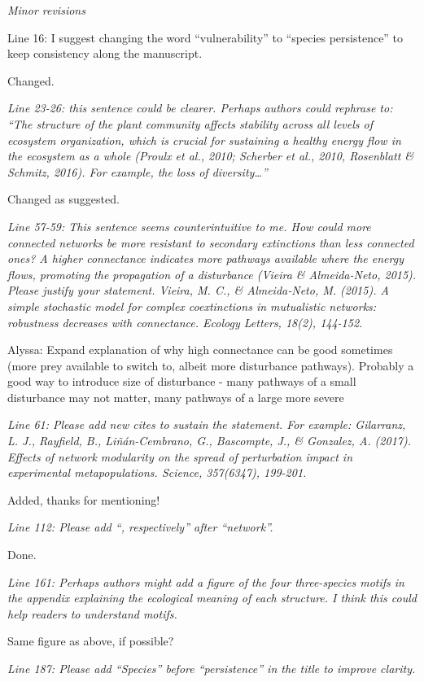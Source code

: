 \documentclass[12pt]{article}
\newcommand{\us}{\rm \setlength{\leftskip}{0.3cm} \setlength{\rightskip}{0.3cm}}
\newcommand{\them}{\it \setlength{\leftskip}{0cm} \setlength{\rightskip}{0cm}}
\begin{document}
\them
Minor revisions

Line 16: I suggest changing the word “vulnerability” to “species persistence” to keep consistency along the manuscript.

\us
Changed.

\them
Line 23-26: this sentence could be clearer. Perhaps authors could rephrase to: “The structure of the plant community affects stability across all levels of ecosystem organization, which is crucial for sustaining a healthy energy flow in the ecosystem as a whole (Proulx et al., 2010; Scherber et al., 2010, Rosenblatt & Schmitz, 2016). For example, the loss of diversity…”

\us Changed as suggested.

\them
Line 57-59: This sentence seems counterintuitive to me. How could more connected networks be more resistant to secondary extinctions than less connected ones? A higher connectance indicates more pathways available where the energy flows, promoting the propagation of a disturbance (Vieira \& Almeida-Neto, 2015). Please justify your statement.
Vieira, M. C., \& Almeida‐Neto, M. (2015). A simple stochastic model for complex coextinctions in mutualistic networks: robustness decreases with connectance. Ecology Letters, 18(2), 144-152.

\us Alyssa: Expand explanation of why high connectance can be good sometimes (more prey available to switch to, albeit more disturbance pathways). Probably a good way to introduce size of disturbance - many pathways of a small disturbance may not matter, many pathways of a large more severe

\them
Line 61: Please add new cites to sustain the statement. For example:
Gilarranz, L. J., Rayfield, B., Liñán-Cembrano, G., Bascompte, J., \& Gonzalez, A. (2017). Effects of network modularity on the spread of perturbation impact in experimental metapopulations. Science, 357(6347), 199-201.

\us
Added, thanks for mentioning!

\them
Line 112: Please add “, respectively” after “network”.

\us
Done.

\them
Line 161: Perhaps authors might add a figure of the four three-species motifs in the appendix explaining the ecological meaning of each structure. I think this could help readers to understand motifs.

\us Same figure as above, if possible?

\them
Line 187: Please add “Species” before “persistence” in the title to improve clarity.
\end{document}
